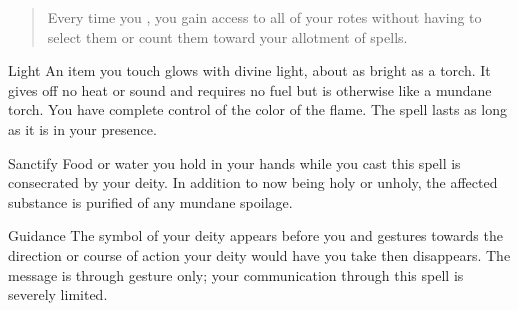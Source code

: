 \documentclass[8pt]{extarticle}
\begin{document}
\begin{multicols}{2}
  \begin{quote}
    Every time you , you gain access to all of your
    rotes without having to select them or count them toward your
    allotment of spells.
  \end{quote}

  \begin{aspell}{Light}{}
    An item you touch glows with divine light, about as bright as a
    torch. It gives off no heat or sound and requires no fuel but is
    otherwise like a mundane torch.  You have complete control of the
    color of the flame. The spell lasts as long as it is in your
    presence.
  \end{aspell}

  \vfill\null
  \columnbreak

  \begin{aspell}{Sanctify}{}
    Food or water you hold in your hands while you cast this spell is
    consecrated by your deity. In addition to now being holy or
    unholy, the affected substance is purified of any mundane
    spoilage.
  \end{aspell}

  \begin{aspell}{Guidance}{}
    The symbol of your deity appears before you and gestures towards
    the direction or course of action your deity would have you take
    then disappears. The message is through gesture only; your
    communication through this spell is severely limited.
  \end{aspell}
\vfill\null
\end{multicols}

\end{document}
